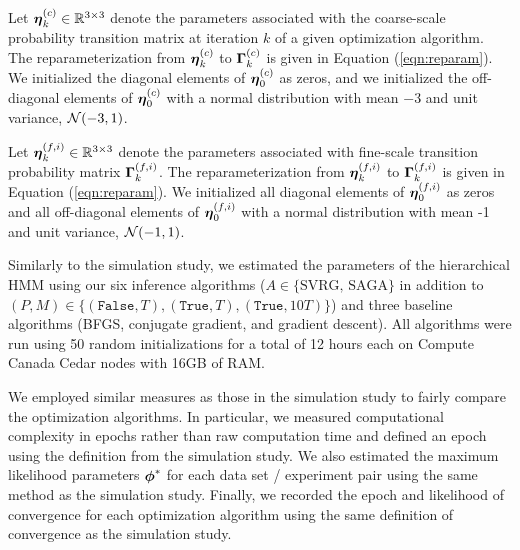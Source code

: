 Let $\boldsymbol{\eta}_k^{(c)} \in \mathbb{R}^{3 \times 3}$ denote the parameters associated with the coarse-scale probability transition matrix at iteration $k$ of a given optimization algorithm. The reparameterization from $\boldsymbol{\eta}_k^{(c)}$ to $\boldsymbol{\Gamma}_k^{(c)}$ is given in Equation (\ref{eqn:reparam}). We initialized the diagonal elements of $\boldsymbol{\eta}_0^{(c)}$ as zeros, and we initialized the off-diagonal elements of $\boldsymbol{\eta}_0^{(c)}$ with a normal distribution with mean $-3$ and unit variance, $\mathcal{N}(-3,1)$.

Let $\boldsymbol{\eta}_k^{(f,i)} \in \mathbb{R}^{3 \times 3}$ denote the parameters associated with fine-scale transition probability matrix $\boldsymbol{\Gamma}_k^{(f,i)}$. The reparameterization from $\boldsymbol{\eta}_k^{(f,i)}$ to $\boldsymbol{\Gamma}_k^{(f,i)}$ is given in Equation (\ref{eqn:reparam}). We initialized all diagonal elements of $\boldsymbol{\eta}_0^{(f,i)}$ as zeros and all off-diagonal elements of $\boldsymbol{\eta}_0^{(f,i)}$ with a normal distribution with mean -1 and unit variance, $\mathcal{N}(-1,1)$.

%
%
Similarly to the simulation study, we estimated the parameters of the hierarchical HMM using our six inference algorithms ($A \in \{\text{SVRG, SAGA}\}$ in addition to $(P,M) \in \{(\texttt{False},T), (\texttt{True},T), (\texttt{True},10T)\}$) and three baseline algorithms (BFGS, conjugate gradient, and gradient descent). All algorithms were run using 50 random initializations for a total of 12 hours each on Compute Canada Cedar nodes with 16GB of RAM.

We employed similar measures as those in the simulation study to fairly compare the optimization algorithms. In particular, we measured computational complexity in epochs rather than raw computation time and defined an epoch using the definition from the simulation study. We also estimated the maximum likelihood parameters $\boldsymbol{\phi}^*$ for each data set / experiment pair using the same method as the simulation study. Finally, we recorded the epoch and likelihood of convergence for each optimization algorithm using the same definition of convergence as the simulation study.

